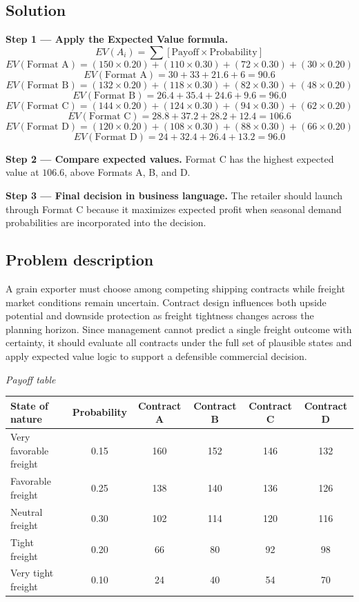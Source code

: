 \begin{ExamProblems}
		\subsection*{Solution}
		\textbf{Step 1 --- Apply the Expected Value formula.}
		\[
		EV(A_i)=\sum [\text{Payoff}\times\text{Probability}]
		\]
		\[
		EV(\text{Format A})=(150\times0.20)+(110\times0.30)+(72\times0.30)+(30\times0.20)
		\]
		\[
		EV(\text{Format A})=30+33+21.6+6=90.6
		\]
		\[
		EV(\text{Format B})=(132\times0.20)+(118\times0.30)+(82\times0.30)+(48\times0.20)
		\]
		\[
		EV(\text{Format B})=26.4+35.4+24.6+9.6=96.0
		\]
		\[
		EV(\text{Format C})=(144\times0.20)+(124\times0.30)+(94\times0.30)+(62\times0.20)
		\]
		\[
		EV(\text{Format C})=28.8+37.2+28.2+12.4=106.6
		\]
		\[
		EV(\text{Format D})=(120\times0.20)+(108\times0.30)+(88\times0.30)+(66\times0.20)
		\]
		\[
		EV(\text{Format D})=24+32.4+26.4+13.2=96.0
		\]
		
		\textbf{Step 2 --- Compare expected values.}
		Format C has the highest expected value at $106.6$, above Formats A, B, and D.
		
		\textbf{Step 3 --- Final decision in business language.}
		The retailer should launch through Format C because it maximizes expected profit when seasonal demand probabilities are incorporated into the decision.
		
		\item
		\subsection*{Problem description}
		A grain exporter must choose among competing shipping contracts while freight market conditions remain uncertain. Contract design influences both upside potential and downside protection as freight tightness changes across the planning horizon. Since management cannot predict a single freight outcome with certainty, it should evaluate all contracts under the full set of plausible states and apply expected value logic to support a defensible commercial decision.

		\begin{center}
			\textit{Payoff table}
			\begin{tabular}{l c c c c c}
				\toprule
				State of nature & Probability & Contract A & Contract B & Contract C & Contract D \\
				\midrule
				Very favorable freight & 0.15 & 160 & 152 & 146 & 132 \\
				Favorable freight & 0.25 & 138 & 140 & 136 & 126 \\
				Neutral freight & 0.30 & 102 & 114 & 120 & 116 \\
				Tight freight & 0.20 & 66 & 80 & 92 & 98 \\
				Very tight freight & 0.10 & 24 & 40 & 54 & 70 \\
				\bottomrule
			\end{tabular}
		\end{center}


\end{ExamProblems}
